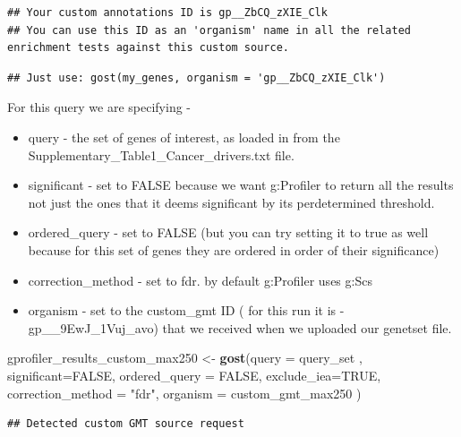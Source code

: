 \documentclass[
]{book}
\newenvironment{Shaded}{\begin{snugshade}}{\end{snugshade}}
\newcommand{\AttributeTok}[1]{\textcolor[rgb]{0.13,0.29,0.53}{#1}}
\newcommand{\ConstantTok}[1]{\textcolor[rgb]{0.56,0.35,0.01}{#1}}
\newcommand{\FunctionTok}[1]{\textcolor[rgb]{0.13,0.29,0.53}{\textbf{#1}}}
\newcommand{\NormalTok}[1]{#1}
\newcommand{\OtherTok}[1]{\textcolor[rgb]{0.56,0.35,0.01}{#1}}
\newcommand{\StringTok}[1]{\textcolor[rgb]{0.31,0.60,0.02}{#1}}
\providecommand{\tightlist}{%
  \setlength{\itemsep}{0pt}\setlength{\parskip}{0pt}}
\begin{document}
\begin{verbatim}
## Your custom annotations ID is gp__ZbCQ_zXIE_Clk
## You can use this ID as an 'organism' name in all the related enrichment tests against this custom source.
\end{verbatim}

\begin{verbatim}
## Just use: gost(my_genes, organism = 'gp__ZbCQ_zXIE_Clk')
\end{verbatim}

For this query we are specifying -

\begin{itemize}
\tightlist
\item
  query - the set of genes of interest, as loaded in from the Supplementary\_Table1\_Cancer\_drivers.txt file.
\item
  significant - set to FALSE because we want g:Profiler to return all the results not just the ones that it deems significant by its perdetermined threshold.
\item
  ordered\_query - set to FALSE (but you can try setting it to true as well because for this set of genes they are ordered in order of their significance)
\item
  correction\_method - set to fdr. by default g:Profiler uses g:Scs
\item
  organism - set to the custom\_gmt ID ( for this run it is - gp\_\_9EwJ\_1Vuj\_avo) that we received when we uploaded our genetset file.
\end{itemize}

\begin{Shaded}
\begin{Highlighting}[]
\NormalTok{gprofiler\_results\_custom\_max250 }\OtherTok{\textless{}{-}} \FunctionTok{gost}\NormalTok{(}\AttributeTok{query =}\NormalTok{ query\_set ,}
                                     \AttributeTok{significant=}\ConstantTok{FALSE}\NormalTok{,}
                                 \AttributeTok{ordered\_query =} \ConstantTok{FALSE}\NormalTok{,}
                                  \AttributeTok{exclude\_iea=}\ConstantTok{TRUE}\NormalTok{,}
                                     \AttributeTok{correction\_method =} \StringTok{"fdr"}\NormalTok{,}
                                 \AttributeTok{organism =}\NormalTok{ custom\_gmt\_max250}
\NormalTok{                                     )}
\end{Highlighting}
\end{Shaded}

\begin{verbatim}
## Detected custom GMT source request
\end{verbatim}
\end{document}
